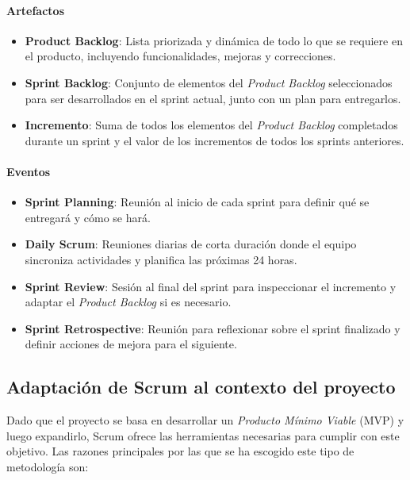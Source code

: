 \paragraph{Artefactos}

\begin{itemize} 
	\item \textbf{Product Backlog}: Lista priorizada y dinámica de todo lo que se requiere en el producto, incluyendo funcionalidades, mejoras y correcciones. 
	\item \textbf{Sprint Backlog}: Conjunto de elementos del \textit{Product Backlog} seleccionados para ser desarrollados en el sprint actual, junto con un plan para entregarlos. 
	\item \textbf{Incremento}: Suma de todos los elementos del \textit{Product Backlog} completados durante un sprint y el valor de los incrementos de todos los sprints anteriores. 
\end{itemize}

\paragraph{Eventos}

\begin{itemize} 
	\item \textbf{Sprint Planning}: Reunión al inicio de cada sprint para definir qué se entregará y cómo se hará. 
	\item \textbf{Daily Scrum}: Reuniones diarias de corta duración donde el equipo sincroniza actividades y planifica las próximas 24 horas. 
	\item \textbf{Sprint Review}: Sesión al final del sprint para inspeccionar el incremento y adaptar el \textit{Product Backlog} si es necesario. 
	\item \textbf{Sprint Retrospective}: Reunión para reflexionar sobre el sprint finalizado y definir acciones de mejora para el siguiente. 
\end{itemize}

\subsection{Adaptación de Scrum al contexto del proyecto}

Dado que el proyecto se basa en desarrollar un \textit{Producto Mínimo Viable} (MVP) y luego expandirlo, Scrum ofrece las herramientas necesarias para cumplir con este objetivo. Las razones principales por las que se ha escogido este tipo de metodología son:


